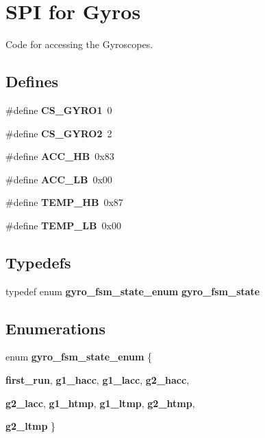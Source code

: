 \section{SPI for Gyros}
\label{group__ro__spi}
Code for accessing the Gyroscopes.  
\subsection*{Defines}
\begin{CompactItemize}
\item 
\#define {\bf CS\_\-GYRO1}~0
\item 
\#define {\bf CS\_\-GYRO2}~2
\item 
\#define {\bf ACC\_\-HB}~0x83
\item 
\#define {\bf ACC\_\-LB}~0x00
\item 
\#define {\bf TEMP\_\-HB}~0x87
\item 
\#define {\bf TEMP\_\-LB}~0x00
\end{CompactItemize}
\subsection*{Typedefs}
\begin{CompactItemize}
\item 
typedef enum {\bf gyro\_\-fsm\_\-state\_\-enum} {\bf gyro\_\-fsm\_\-state}
\end{CompactItemize}
\subsection*{Enumerations}
\begin{CompactItemize}
\item 
enum {\bf gyro\_\-fsm\_\-state\_\-enum} \{ \par
{\bf first\_\-run}, 
{\bf g1\_\-hacc}, 
{\bf g1\_\-lacc}, 
{\bf g2\_\-hacc}, 
\par
{\bf g2\_\-lacc}, 
{\bf g1\_\-htmp}, 
{\bf g1\_\-ltmp}, 
{\bf g2\_\-htmp}, 
\par
{\bf g2\_\-ltmp}
 \}
\end{CompactItemize}
